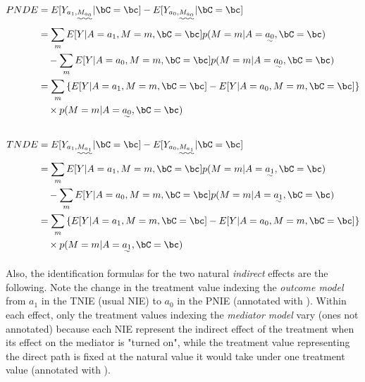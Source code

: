 \documentclass[dvipdfmx,10pt]{article}
\begin{document}
\begin{align*}
  PNDE
  &= E[Y_{a_{1},\uwave{M_{a_{0}}}} | \bC = \bc] - E[Y_{a_{0},\uwave{M_{a_{0}}}} | \bC = \bc]\\
  &=     \sum_{m} E[Y | A = a_{1}, M = m, \bC = \bc] p(M = m | A = \uwave{a_{0}}, \bC = \bc)\\
  &~~~ - \sum_{m} E[Y | A = a_{0}, M = m, \bC = \bc] p(M = m | A = \uwave{a_{0}}, \bC = \bc)\\
  &= \sum_{m} \left\{ E[Y | A = a_{1}, M = m, \bC = \bc] - E[Y | A = a_{0}, M = m, \bC = \bc] \right\}\\
  &~~~ \times p(M = m | A = \uwave{a_{0}}, \bC = \bc)\\
  \\
  TNDE
  &= E[Y_{a_{1},\uwave{M_{a_{1}}}} | \bC = \bc] - E[Y_{a_{0},\uwave{M_{a_{1}}}} | \bC = \bc]\\
  &=     \sum_{m} E[Y | A = a_{1}, M = m, \bC = \bc] p(M = m | A = \uwave{a_{1}}, \bC = \bc)\\
  &~~~ - \sum_{m} E[Y | A = a_{0}, M = m, \bC = \bc] p(M = m | A = \uwave{a_{1}}, \bC = \bc)\\
  &= \sum_{m} \left\{ E[Y | A = a_{1}, M = m, \bC = \bc] - E[Y | A = a_{0}, M = m, \bC = \bc] \right\}\\
  &~~~ \times p(M = m | A = \uwave{a_{1}}, \bC = \bc)\\
\end{align*}

Also, the identification formulas for the two natural \emph{indirect} effects are the following. Note the change in the treatment value indexing the \emph{outcome model} from \(a_{1}\) in the TNIE (usual NIE) to \(a_{0}\) in the PNIE (annotated with \uwave{~~~~}). Within each effect, only the treatment values indexing the \emph{mediator model} vary (ones not annotated) because each NIE represent the indirect effect of the treatment when its effect on the mediator is "turned on", while the treatment value representing the direct path is fixed at the natural value it would take under one treatment value (annotated with \uwave{~~~~}).
\end{document}

